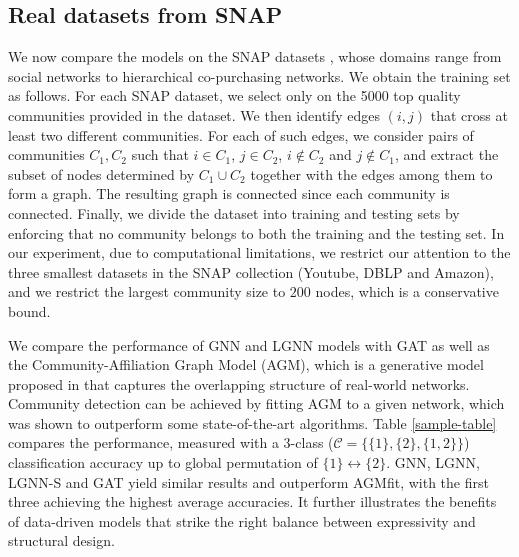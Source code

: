 \documentclass{article} \usepackage{iclr2019_conference,times}
\begin{document}
\subsection{Real datasets from SNAP}
\label{snapsec}
We now compare the models on the SNAP datasets \citep{snapnets}, whose domains range from social networks to hierarchical co-purchasing networks. We obtain the training set as follows. For each SNAP dataset, we select only on the 5000 top quality communities provided in the dataset. We then identify edges $(i,j)$ that cross at least two different communities. For each of such edges, we consider pairs of communities $C_1, C_2$ such that $i \in C_1$, $j \in C_2$, $i \notin C_2$ and $j \notin C_1$, and extract the subset of nodes determined by $C_1 \cup C_2$ together with the edges among them to form a graph. The resulting graph is connected since each community is connected. Finally, we divide the dataset into training and testing sets by enforcing 
that no community belongs to both the training and the testing set.
In our experiment, due to computational limitations, we restrict our attention to the three smallest datasets in the SNAP collection (Youtube, DBLP and Amazon), and we restrict the largest community size to $200$ nodes, which is a conservative bound.


We compare the performance of GNN and LGNN models with GAT as well as the Community-Affiliation Graph Model (AGM), which is a generative model proposed in \cite{JureJaewon_overlapping_com} that captures the overlapping structure of real-world networks.
Community detection can be achieved by fitting AGM to a given network, which was shown to outperform some state-of-the-art algorithms. 
Table \ref{sample-table} compares the performance, measured with a 3-class ($\mathcal{C} = \{ \{1\},\{2\}, \{1, 2\}\}$) classification accuracy up to global permutation of $\{1\} \leftrightarrow \{2\}$. GNN, LGNN, LGNN-S and GAT yield similar results and outperform AGMfit, with the first three achieving the highest average accuracies. It further illustrates the benefits of data-driven models that strike the right balance 
between expressivity and structural design.
\end{document}
